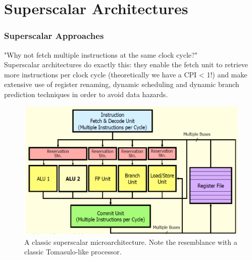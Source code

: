 \documentclass[10pt,a4paper]{article}
\begin{document}
	\part{Superscalar Architectures}	
		\section{Superscalar Approaches}
			"Why not fetch multiple instructions at the same clock cycle?"\\
			Superscalar architectures do exactly this: they enable the fetch unit to retrieve more instructions per clock cycle (theoretically we have a CPI < 1!) and make extensive use of register renaming, dynamic scheduling and dynamic branch prediction techniques in order to avoid data hazards.
			\begin{figure}[H]
				\centering
				\includegraphics[width = \textwidth]{./images/superscalar.png}
				\caption{A classic superscalar microarchitecture. Note the resemblance with a classic Tomasulo-like processor.}
			\end{figure}
			
\end{document}

